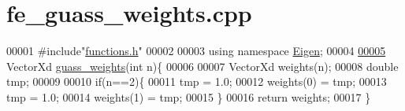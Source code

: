 \hypertarget{fe__guass__weights_8cpp_source}{}\section{fe\+\_\+guass\+\_\+weights.\+cpp}
\label{fe__guass__weights_8cpp_source}

\begin{DoxyCode}
00001 \textcolor{preprocessor}{#include"\hyperlink{functions_8h}{functions.h}"}
00002 
00003 \textcolor{keyword}{using namespace }\hyperlink{namespace_eigen}{Eigen};
00004 
\hyperlink{fe__guass__weights_8cpp_a84dcc9575e861bdb2872c10ba6238ee4}{00005} VectorXd \hyperlink{fe__guass__weights_8cpp_a84dcc9575e861bdb2872c10ba6238ee4}{guass\_weights}(\textcolor{keywordtype}{int} n)\{
00006 
00007     VectorXd weights(n);
00008     \textcolor{keywordtype}{double} tmp;
00009 
00010     \textcolor{keywordflow}{if}(n==2)\{
00011         tmp = 1.0;
00012         weights(0) = tmp;
00013         tmp = 1.0;
00014         weights(1) = tmp;
00015     \}
00016     \textcolor{keywordflow}{return} weights;
00017 \}
\end{DoxyCode}
